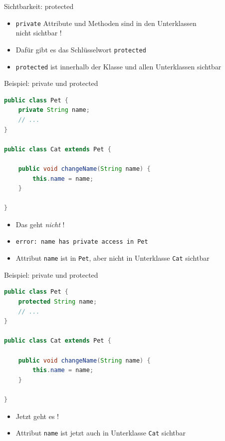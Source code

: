 \documentclass[18pt]{beamer}
\begin{document}
\begin{frame}{Sichtbarkeit: protected}

    \begin{itemize}
        \item \texttt{private} Attribute und Methoden sind in den Unterklassen\\ \alert{nicht} sichtbar !
        \item Dafür gibt es das Schlüsselwort \texttt{protected}
        \item \texttt{protected} ist innerhalb der Klasse und allen Unterklassen sichtbar
    \end{itemize}
\end{frame}

\begin{frame}[fragile]{Beispiel: private und protected}
    \begin{exampleblock}{}
        \begin{lstlisting}[language=Java,basicstyle=\scriptsize]
public class Pet {
    private String name;
    // ...
}

public class Cat extends Pet {

    public void changeName(String name) {
        this.name = name;
    }

}
        \end{lstlisting}
    \end{exampleblock}

    \begin{itemize}
        \item Das geht \textit{nicht} !
        \item \texttt{error: name has private access in Pet}
        \item Attribut \texttt{name} ist in \texttt{Pet}, aber nicht in Unterklasse \texttt{Cat} sichtbar
    \end{itemize}
\end{frame}

\begin{frame}[fragile]{Beispiel: private und protected}
    \begin{exampleblock}{}
        \begin{lstlisting}[language=Java,basicstyle=\scriptsize]
public class Pet {
    protected String name;
    // ...
}

public class Cat extends Pet {

    public void changeName(String name) {
        this.name = name;
    }

}
        \end{lstlisting}
    \end{exampleblock}

    \begin{itemize}
        \item Jetzt geht es !
        \item Attribut \texttt{name} ist jetzt auch in Unterklasse \texttt{Cat} sichtbar
    \end{itemize}
\end{frame}
\end{document}
